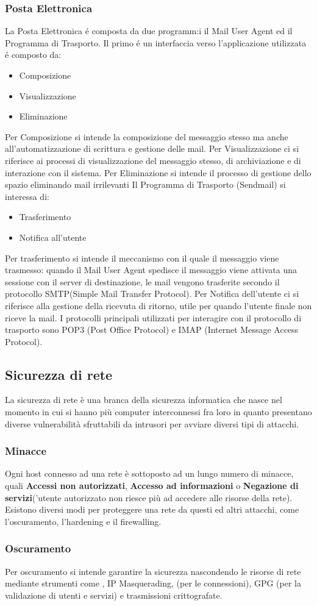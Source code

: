 \documentclass[a4paper,11pt]{article}
\def\sub#1{\subsection{#1}\label{#1}}
\def\subsub#1{\subsubsection{#1}\label{#1}}
\def\vedi#1{\nameref{#1}}
\begin{document}
 \subsub {Posta Elettronica}
La Posta Elettronica \'e composta da due programm:i il Mail User Agent ed il Programma di Trasporto. Il primo \'e un interfaccia verso l'applicazione utilizzata \'e composto da:
 \begin{itemize}
 	\item Composizione 
 	\item Visualizzazione
 	\item Eliminazione
 \end{itemize}
 Per Composizione si intende la composizione del messaggio stesso ma anche all'automatizzazione  di scrittura e gestione delle mail.\newline
 Per Visualizzazione ci si riferisce ai processi di visualizzazione del messaggio stesso, di archiviazione e di interazione con il sistema.\newline
 Per Eliminazione si intende il processo di gestione dello spazio eliminando mail irrilevanti\newline
 Il Programma di Trasporto (Sendmail) si interessa di:
 \begin{itemize}
	\item Trasferimento
	\item Notifica all'utente
 \end{itemize}
 Per trasferimento si intende il meccanismo con il quale il messaggio viene trasmesso: quando il Mail User Agent spedisce il messaggio viene attivata una sessione con il server di destinazione, le mail vengono trasferite secondo il protocollo SMTP(Simple Mail Transfer Protocol).\newline 
 Per Notifica dell'utente ci si riferisce alla gestione della ricevuta di ritorno, utile per quando l'utente finale non riceve la mail.\newline
 I protocolli principali utilizzati per interagire con il protocollo di trasporto sono POP3 (Post Office Protocol) e IMAP (Internet Message Access Protocol). %

\newpage
\sub{Sicurezza di rete}
La sicurezza di rete è una branca della sicurezza informatica che nasce nel momento in cui si hanno più computer interconnessi fra loro in quanto presentano diverse vulnerabilità sfruttabili da intrusori per avviare diversi tipi di attacchi.
\subsub{Minacce} 
Ogni host connesso ad una rete è sottoposto ad un lungo numero di minacce, quali \textbf{Accessi non autorizzati}, \textbf{Accesso ad informazioni} o \textbf{Negazione di servizi}('utente autorizzato non riesce più ad accedere alle risorse della rete).\\
Esistono diversi modi per proteggere una rete da questi ed altri attacchi, come l'oscuramento, l'hardening e il firewalling.
\subsub{Oscuramento}
Per oscuramento si intende garantire la sicurezza nascondendo le risorse di rete mediante strumenti come \vedi{NAT}, IP Masquerading, \vedi{SSH} (per le connessioni), GPG (per la validazione di utenti e servizi) e trasmissioni crittografate.
\end{document}
